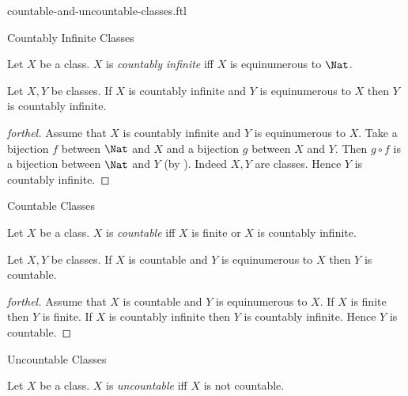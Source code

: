 \documentclass{naproche-library}
\begin{document}
\begin{smodule}[title=Countable and Uncountable Classes]{countable-and-uncountable-classes.ftl}

\begin{sfragment}{Countably Infinite Classes}
  \begin{definition}[forthel,id=FOUNDATIONS_14_6249029537103872]
    Let $X$ be a class.
    $X$ is \emph{countably infinite} iff $X$ is equinumerous to $\Nat$.
  \end{definition}

  \begin{proposition}[forthel,id=FOUNDATIONS_14_803449379749888]
    Let $X, Y$ be classes.
    If $X$ is countably infinite and $Y$ is equinumerous to $X$ then $Y$ is countably infinite.
  \end{proposition}
  \begin{proof}[forthel]
    Assume that $X$ is countably infinite and $Y$ is equinumerous to $X$.
    Take a bijection $f$ between $\Nat$ and $X$ and a bijection $g$ between $X$ and $Y$.
    Then $g \circ f$ is a bijection between $\Nat$ and $Y$ (by ).
    Indeed $X, Y$ are classes.
    Hence $Y$ is countably infinite.
  \end{proof}
\end{sfragment}

\begin{sfragment}{Countable Classes}
  \begin{definition}[forthel,id=FOUNDATIONS_14_5412969443753984]
    Let $X$ be a class.
    $X$ is \emph{countable} iff $X$ is finite or $X$ is countably infinite.
  \end{definition}

  \begin{proposition}[forthel,id=FOUNDATIONS_14_4182588499427328]
    Let $X, Y$ be classes.
    If $X$ is countable and $Y$ is equinumerous to $X$ then $Y$ is countable.
  \end{proposition}
  \begin{proof}[forthel]
    Assume that $X$ is countable and $Y$ is equinumerous to $X$.
    If $X$ is finite then $Y$ is finite.
    If $X$ is countably infinite then $Y$ is countably infinite.
    Hence $Y$ is countable.
  \end{proof}
\end{sfragment}

\begin{sfragment}{Uncountable Classes}
  \begin{definition}[forthel,id=FOUNDATIONS_14_2411928395710464]
    Let $X$ be a class.
    $X$ is \emph{uncountable} iff $X$ is not countable.
  \end{definition}


\end{sfragment}
\end{smodule}
\end{document}
